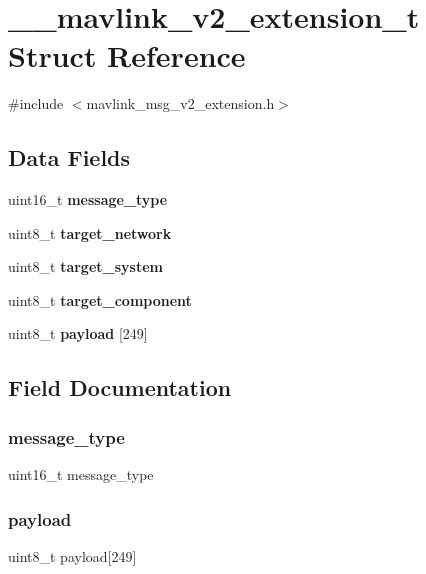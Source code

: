 \section{\+\_\+\+\_\+mavlink\+\_\+v2\+\_\+extension\+\_\+t Struct Reference}
\label{struct____mavlink__v2__extension__t}


{\ttfamily \#include $<$mavlink\+\_\+msg\+\_\+v2\+\_\+extension.\+h$>$}

\subsection*{Data Fields}
\begin{DoxyCompactItemize}
\item 
uint16\+\_\+t \textbf{ message\+\_\+type}
\item 
uint8\+\_\+t \textbf{ target\+\_\+network}
\item 
uint8\+\_\+t \textbf{ target\+\_\+system}
\item 
uint8\+\_\+t \textbf{ target\+\_\+component}
\item 
uint8\+\_\+t \textbf{ payload} [249]
\end{DoxyCompactItemize}


\subsection{Field Documentation}
\mbox{\label{struct____mavlink__v2__extension__t_a40dcf491a9a92c9867bb34c99a01e05f}} 
\subsubsection{message\+\_\+type}
{\footnotesize\ttfamily uint16\+\_\+t message\+\_\+type}

\mbox{\label{struct____mavlink__v2__extension__t_a1c8e60abc72390cb05850a080a34be24}} 
\subsubsection{payload}
{\footnotesize\ttfamily uint8\+\_\+t payload[249]}

